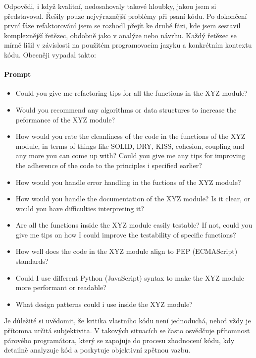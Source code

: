 \documentclass[FM,DP]{tulthesis}
\begin{document}
		Odpovědi, i když kvalitní, nedosahovaly takové hloubky, jakou jsem si představoval. Řešily pouze nejvýraznější problémy při psaní kódu. Po dokončení první fáze refaktorování jsem se rozhodl přejít ke druhé fázi, kde jsem sestavil komplexnější řetězec, obdobně jako v analýze nebo návrhu. Každý řetězec se mírně lišil v závislosti na použitém programovacím jazyku a konkrétním kontextu kódu. Obecněji vypadal takto:
		\vspace{0.6em}
		\begin{tcolorbox}[colback=white,colframe=black]
			\paragraph{Prompt}
			\begin{itemize}
				\item{Could you give me refactoring tips for all the functions in the XYZ module?}
				\item{Would you recommend any algorithms or data structures to increase the peformance of the XYZ module?}
				\item{How would you rate the cleanliness of the code in the functions of the XYZ module, in terms of things like SOLID, DRY, KISS, cohesion, coupling and any more you can come up with? Could you give me any tips for improving the adherence of the code to the principles i specified earlier?}
				\item{How would you handle error handling in the fuctions of the XYZ module?}
				\item{How would you handle the documentation of the XYZ module? Is it clear, or would you have difficulties interpreting it?}
				\item{Are all the functions inside the XYZ module easily testable? If not, could you give me tips on how I could improve the testability of specific functions?}
				\item{How well does the code in the XYZ module align to PEP (ECMAScript) standards?}
				\item{Could I use different Python (JavaScript) syntax to make the XYZ module more performant or readable?}
				\item{What design patterns could i use inside the XYZ module?}
			\end{itemize}
		\end{tcolorbox}
		
		Je důležité si uvědomit, že kritika vlastního kódu není jednoduchá, neboť vždy je přítomna určitá subjektivita. V takových situacích se často osvědčuje přítomnost párového programátora, který se zapojuje do procesu zhodnocení kódu, kdy detailně analyzuje kód a poskytuje objektivní zpětnou vazbu. 
		
\end{document}
